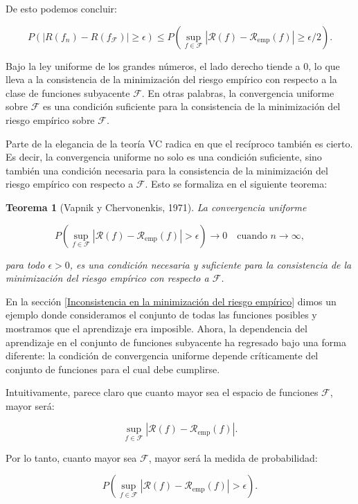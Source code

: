 \documentclass{article}
\newtheorem{thm}{Teorema}[subsection]
\begin{document}
De esto podemos concluir:

\[
P\left(|R(f_n) - R(f_\mathcal{F})| \geq \epsilon \right) \leq P\left(\sup_{f \in \mathcal{F}} |\mathcal{R}(f) - \mathcal{R}_{\text{emp}}(f)| \geq \epsilon/2\right).
\]

Bajo la ley uniforme de los grandes números, el lado derecho tiende a \(0\), lo que lleva a la consistencia de 
la minimización del riesgo empírico con respecto a la clase de funciones subyacente \(\mathcal{F}\). En otras palabras, 
la convergencia uniforme sobre \(\mathcal{F}\) es una condición suficiente para la consistencia de la minimización del 
riesgo empírico sobre \(\mathcal{F}\).


Parte de la elegancia de la teoría VC radica en que el recíproco también es cierto. Es decir, 
la convergencia uniforme no solo es una condición suficiente, sino también una condición necesaria para la 
consistencia de la minimización del riesgo empírico con respecto a \(\mathcal{F}\). Esto se formaliza en el siguiente 
teorema:

\begin{thm}[Vapnik y Chervonenkis, 1971]
La convergencia uniforme
    
    \[
        P\left(\sup_{f \in \mathcal{F}} |\mathcal{R}(f) - \mathcal{R}_{\text{emp}}(f)| > \epsilon \right) \to 0 \quad \text{cuando } n \to \infty, 
        \]
        
        para todo \(\epsilon > 0\), es una condición necesaria y suficiente para la consistencia de la minimización del 
        riesgo empírico con respecto a \(\mathcal{F}\).
\end{thm}
        
En la sección \ref{Inconsistencia en la minimización del riesgo empírico} dimos un ejemplo donde consideramos el conjunto de todas las funciones posibles y mostramos 
que el aprendizaje era imposible. Ahora, la dependencia del aprendizaje en el conjunto de funciones subyacente 
ha regresado bajo una forma diferente: la condición de convergencia uniforme depende críticamente del conjunto 
de funciones para el cual debe cumplirse. 

Intuitivamente, parece claro que cuanto mayor sea el espacio de funciones \(\mathcal{F}\), mayor será:

\[
\sup_{f \in \mathcal{F}} |\mathcal{R}(f) - \mathcal{R}_{\text{emp}}(f)|.
\]

Por lo tanto, cuanto mayor sea \(\mathcal{F}\), mayor será la medida de probabilidad:

\[
P\left(\sup_{f \in \mathcal{F}} |\mathcal{R}(f) - \mathcal{R}_{\text{emp}}(f)| > \epsilon \right).
\]
\end{document}
